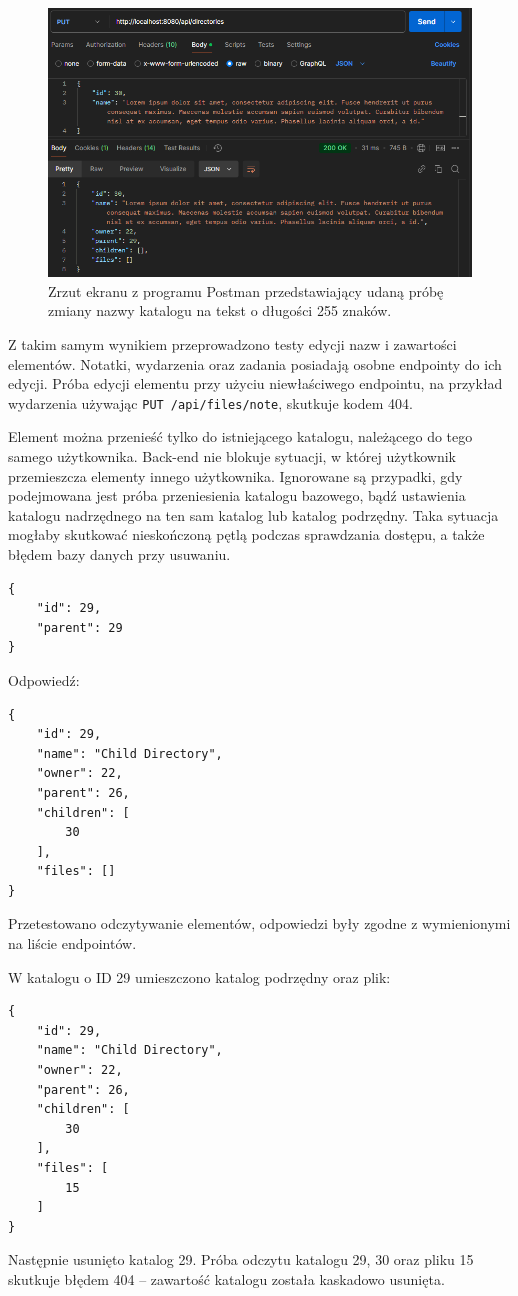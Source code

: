 \documentclass[a4paper,twoside,12pt]{book}
\begin{document}
\begin{figure}
\centering
\includegraphics[width=\textwidth]{./ChangeName255.png}
\caption{Zrzut ekranu z programu Postman przedstawiający udaną próbę zmiany nazwy katalogu na tekst o długości 255 znaków.}
\label{fig:change-name-255}
\end{figure}

Z takim samym wynikiem przeprowadzono testy edycji nazw i zawartości elementów. Notatki, wydarzenia oraz zadania posiadają osobne endpointy do ich edycji. Próba edycji elementu przy użyciu niewłaściwego endpointu, na przykład wydarzenia używając \texttt{PUT /api/files/note}, skutkuje kodem 404.

Element można przenieść tylko do istniejącego katalogu, należącego do tego samego użytkownika. Back-end nie blokuje sytuacji, w której użytkownik przemieszcza elementy innego użytkownika. Ignorowane są przypadki, gdy podejmowana jest próba przeniesienia katalogu bazowego, bądź ustawienia katalogu nadrzędnego na ten sam katalog lub katalog podrzędny. Taka sytuacja mogłaby skutkować nieskończoną pętlą podczas sprawdzania dostępu, a także błędem bazy danych przy usuwaniu.
\begin{verbatim}
{
	"id": 29,
	"parent": 29
}
\end{verbatim}
Odpowiedź:
\begin{verbatim}
{
	"id": 29,
	"name": "Child Directory",
	"owner": 22,
	"parent": 26,
	"children": [
		30
	],
	"files": []
}
\end{verbatim}

Przetestowano odczytywanie elementów, odpowiedzi były zgodne z wymienionymi na liście endpointów.

W katalogu o ID 29 umieszczono katalog podrzędny oraz plik:
\begin{verbatim}
{
	"id": 29,
	"name": "Child Directory",
	"owner": 22,
	"parent": 26,
	"children": [
		30
	],
	"files": [
		15
	]
}
\end{verbatim}
Następnie usunięto katalog 29. Próba odczytu katalogu 29, 30 oraz pliku 15 skutkuje błędem 404 -- zawartość katalogu została kaskadowo usunięta.
\end{document}
